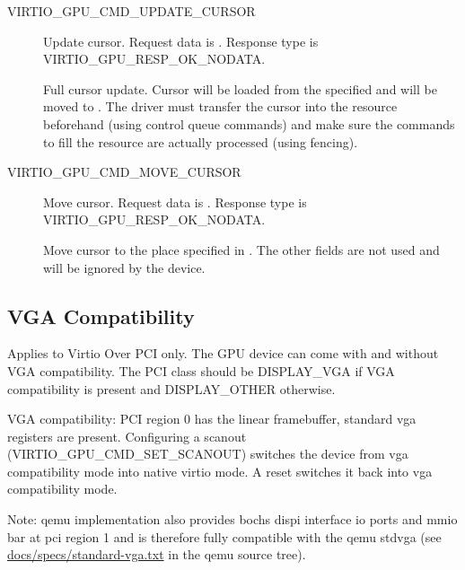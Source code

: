 \begin{description}

\item[VIRTIO_GPU_CMD_UPDATE_CURSOR]
Update cursor.
Request data is .
Response type is VIRTIO_GPU_RESP_OK_NODATA.

Full cursor update.  Cursor will be loaded from the specified
 and will be moved to .  The driver must
transfer the cursor into the resource beforehand (using control queue
commands) and make sure the commands to fill the resource are actually
processed (using fencing).

\item[VIRTIO_GPU_CMD_MOVE_CURSOR]
Move cursor.
Request data is .
Response type is VIRTIO_GPU_RESP_OK_NODATA.

Move cursor to the place specified in .  The other fields
are not used and will be ignored by the device.

\end{description}

\subsection{VGA Compatibility}\label{sec:Device Types / GPU Device / VGA Compatibility}

Applies to Virtio Over PCI only.  The GPU device can come with and
without VGA compatibility.  The PCI class should be DISPLAY_VGA if VGA
compatibility is present and DISPLAY_OTHER otherwise.

VGA compatibility: PCI region 0 has the linear framebuffer, standard
vga registers are present.  Configuring a scanout
(VIRTIO_GPU_CMD_SET_SCANOUT) switches the device from vga
compatibility mode into native virtio mode.  A reset switches it back
into vga compatibility mode.

Note: qemu implementation also provides bochs dispi interface io ports
and mmio bar at pci region 1 and is therefore fully compatible with
the qemu stdvga (see \href{https://git.qemu-project.org/?p=qemu.git;a=blob;f=docs/specs/standard-vga.txt;hb=HEAD}{docs/specs/standard-vga.txt} in the qemu source tree).
